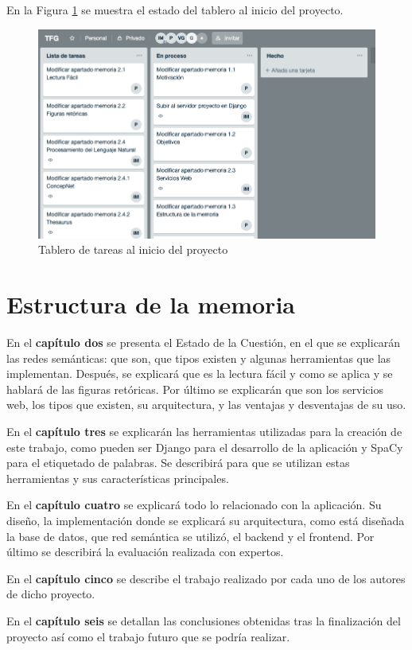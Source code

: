 En la Figura \ref{fig:trello} se muestra el estado del tablero al inicio del proyecto.
\begin{figure}[!h]
	\includegraphics[width=1.0\textwidth]{Imagenes/Bitmap/Capitulo1/trello.png}
	\caption{Tablero de tareas al inicio del proyecto}
	\label{fig:trello}
\end{figure}


\section{Estructura de la memoria}
\label{cap:sec:estructuramemoria}


En el \textbf{capítulo dos} se presenta el Estado de la Cuestión, en el que se explicarán las redes semánticas: que son, que tipos existen y algunas herramientas que las implementan. Después, se explicará que es la lectura fácil y como se aplica y se hablará de las figuras retóricas. Por último se explicarán que son los servicios web, los tipos que existen, su arquitectura, y las ventajas y desventajas de su uso.

En el \textbf{capítulo tres} se explicarán las herramientas utilizadas para la creación de este trabajo, como pueden ser Django para el desarrollo de la aplicación y SpaCy para el etiquetado de palabras. Se describirá para que se utilizan estas herramientas y sus características principales.

En el \textbf{capítulo cuatro} se explicará todo lo relacionado con la aplicación. Su diseño, la implementación donde se explicará su arquitectura, como está diseñada la base de datos, que red semántica se utilizó, el backend y el frontend. Por último se describirá la evaluación realizada con expertos.

 
En el \textbf{capítulo cinco} se describe el trabajo realizado por cada uno de los autores de dicho proyecto.

En el \textbf{capítulo seis} se detallan las conclusiones obtenidas tras la finalización del proyecto así como el trabajo futuro que se podría realizar.